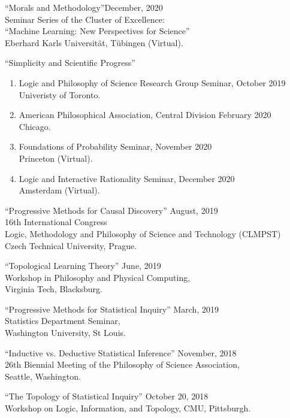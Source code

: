 \documentclass[12pt]{res} %
\begin{document}
\begin{resume}
``Morals and Methodology''\hfill December, 2020\\
Seminar Series of the Cluster of Excellence:\\
``Machine Learning: New Perspectives for Science''\\
Eberhard Karls Universität, Tübingen (Virtual).

``Simplicity and Scientific Progress''\\
\begin{enumerate}
\item Logic and Philosophy of Science Research Group Seminar, \hfill October 2019\\ Univeristy of Toronto. 
\item American Philosophical Association, Central Division \hfill February 2020\\ Chicago. 
\item Foundations of Probability Seminar, \hfill November 2020\\ Princeton (Virtual). 
\item Logic and Interactive Rationality Seminar, \hfill December 2020\\ Amsterdam (Virtual). 
\end{enumerate}

``Progressive Methods for Causal Discovery'' \hfill August, 2019\\
16th International Congress\\ Logic, Methodology and Philosophy of Science and Technology (CLMPST)\\
Czech Technical University, Prague.

``Topological Learning Theory'' \hfill June, 2019\\
Workshop in Philosophy and Physical Computing,\\
Virginia Tech, Blacksburg.

``Progressive Methods for Statistical Inquiry'' \hfill March, 2019\\
Statistics Department Seminar,\\
Washington University, St Louis. 

``Inductive vs. Deductive Statistical Inference'' \hfill November, 2018\\
26th Biennial Meeting of the Philosophy of Science Association,\\
Seattle, Washington.

``The Topology of Statistical Inquiry'' \hfill October 20, 2018\\
Workshop on Logic, Information, and Topology,
CMU, Pittsburgh.


\end{resume}
\end{document}
